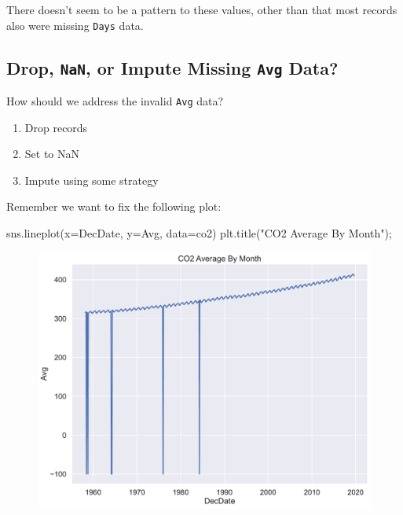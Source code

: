 \documentclass[
  letterpaper,
  DIV=11,
  numbers=noendperiod]{scrreprt}
\newenvironment{Shaded}{\begin{snugshade}}{\end{snugshade}}
\newcommand{\NormalTok}[1]{\textcolor[rgb]{0.00,0.23,0.31}{#1}}
\newcommand{\OperatorTok}[1]{\textcolor[rgb]{0.37,0.37,0.37}{#1}}
\newcommand{\StringTok}[1]{\textcolor[rgb]{0.13,0.47,0.30}{#1}}
\providecommand{\tightlist}{%
  \setlength{\itemsep}{0pt}\setlength{\parskip}{0pt}}\usepackage{longtable,booktabs,array}
\begin{document}
There doesn't seem to be a pattern to these values, other than that most
records also were missing \texttt{Days} data.

\hypertarget{drop-nan-or-impute-missing-avg-data}{%
\subsection{\texorpdfstring{Drop, \texttt{NaN}, or Impute Missing
\texttt{Avg}
Data?}{Drop, NaN, or Impute Missing Avg Data?}}\label{drop-nan-or-impute-missing-avg-data}}

How should we address the invalid \texttt{Avg} data?

\begin{enumerate}
\def\labelenumi{\arabic{enumi}.}
\tightlist
\item
  Drop records
\item
  Set to NaN
\item
  Impute using some strategy
\end{enumerate}

Remember we want to fix the following plot:

\begin{Shaded}
\begin{Highlighting}[]
\NormalTok{sns.lineplot(x}\OperatorTok{=}\StringTok{\textquotesingle{}DecDate\textquotesingle{}}\NormalTok{, y}\OperatorTok{=}\StringTok{\textquotesingle{}Avg\textquotesingle{}}\NormalTok{, data}\OperatorTok{=}\NormalTok{co2)}
\NormalTok{plt.title(}\StringTok{"CO2 Average By Month"}\NormalTok{)}\OperatorTok{;}
\end{Highlighting}
\end{Shaded}

\begin{figure}[H]

{\centering \includegraphics{eda/eda_files/figure-pdf/cell-71-output-1.pdf}

}

\end{figure}
\end{document}
